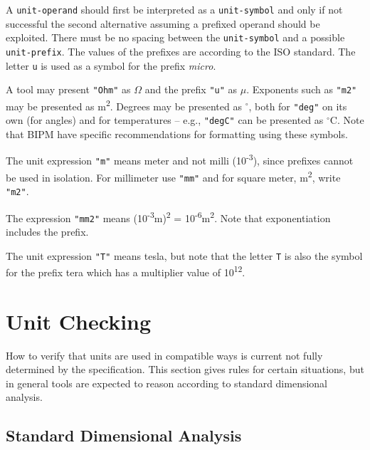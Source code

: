 A \lstinline[language=grammar]!unit-operand! should first be interpreted as a \lstinline[language=grammar]!unit-symbol! and only if not successful the second alternative assuming a prefixed operand should be exploited.
There must be no spacing between the \lstinline[language=grammar]!unit-symbol! and a possible \lstinline[language=grammar]!unit-prefix!.
The values of the prefixes are according to the ISO standard.
The letter \lstinline!u! is used as a symbol for the prefix \emph{micro}.

\begin{nonnormative}
A tool may present \lstinline!"Ohm"! as $\Omega$ and the prefix \lstinline!"u"! as $\mu$.
Exponents such as \lstinline!"m2"! may be presented as m\textsuperscript{2}.
Degrees may be presented as $^{\circ}$, both for \lstinline!"deg"! on its own (for angles) and for temperatures -- e.g., \lstinline!"degC"! can be presented as $^{\circ}$C.
Note that BIPM have specific recommendations for formatting using these symbols.
\end{nonnormative}

\begin{example}
The unit expression \lstinline!"m"! means meter and not milli (10\textsuperscript{-3}), since prefixes cannot be used in isolation.
For millimeter use \lstinline!"mm"! and for square meter, m\textsuperscript{2}, write \lstinline!"m2"!.

The expression \lstinline!"mm2"! means (10\textsuperscript{-3}m)\textsuperscript{2} = 10\textsuperscript{-6}m\textsuperscript{2}.
Note that exponentiation includes the prefix.

The unit expression \lstinline!"T"! means tesla, but note that the letter \lstinline!T! is also the symbol for the prefix tera which has a multiplier value of 10\textsuperscript{12}.
\end{example}


\section{Unit Checking}\label{unit-checking}

How to verify that units are used in compatible ways is current not fully determined by the specification.
This section gives rules for certain situations, but in general tools are expected to reason according to standard dimensional analysis.


\subsection{Standard Dimensional Analysis}\label{standard-dimensional-analysis}

